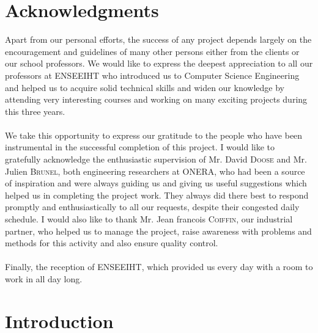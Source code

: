 \documentclass{report}
\begin{document}
\section *{Acknowledgments}
\hspace{1cm}Apart from our personal efforts, the success of any project 
depends largely on the encouragement and guidelines of many 
other persons either from the clients or our school professors. We would like to 
express the deepest appreciation to all our professors at ENSEEIHT
 who introduced us to Computer Science Engineering and helped 
us to acquire solid technical skills and widen our knowledge by
 attending very interesting courses and working on many exciting 
projects during this three years.\\ \\
\hspace*{1cm}We take this opportunity to express our
gratitude to the people who have been instrumental in the 
successful completion of this project. I would like to gratefully 
acknowledge the enthusiastic supervision of Mr. David  \textsc{Doose} and
Mr. Julien  \textsc{Brunel}, both engineering researchers at ONERA, 
who had been a source of inspiration and were always guiding us 
and giving us useful suggestions which helped us in completing
 the project work. They always did there best to
 respond promptly and enthusiastically to all our requests, 
despite their congested daily schedule. I would also like to thank Mr. Jean francois  \textsc{Coiffin}, our
 industrial partner, who helped us to manage the project, 
raise awareness with problems and methods
for this activity and also ensure quality control. \\ \\
\hspace*{1cm}Finally, the reception of ENSEEIHT, which provided us every day
with a room to work in all day long.

\newpage
\section *{Introduction}
\end{document}
